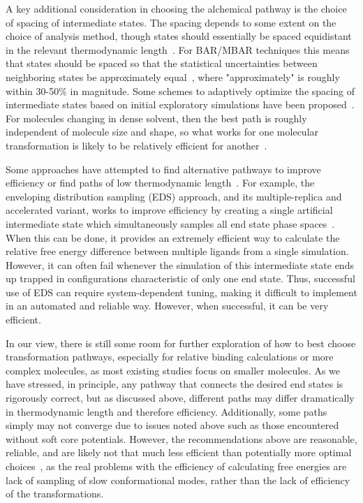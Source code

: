\documentclass[9pt,bestpractices]{livecoms}
\begin{document}
A key additional consideration in choosing the alchemical pathway is the choice of spacing of intermediate states.
The spacing depends to some extent on the choice of analysis method, though states should essentially be spaced equidistant in the relevant thermodynamic length~\cite{crooks2007measuring, sivak2012thermodynamic}.
For BAR/MBAR techniques this means that states should be spaced so that the statistical uncertainties between neighboring states be approximately equal~\cite{pham2012optimal, shenfeld2009minimizing}, where "approximately" is roughly within 30-50\% in magnitude. 
Some schemes to adaptively optimize the spacing of intermediate states based on initial exploratory simulations have been proposed~\cite{hayes2017adaptive}. For molecules changing in dense solvent, then the best path is roughly independent of molecule size and shape, so what works for one molecular transformation is likely to be relatively efficient for another~\cite{monroe2014converging}.


Some approaches have attempted to find alternative pathways to improve efficiency or find paths of low thermodynamic length~\cite{naden2014linear,naden2015linear,pham2012optimal}. For example, the enveloping distribution sampling (EDS) approach, and its multiple-replica and accelerated variant, works to improve efficiency by creating a single artificial intermediate state which simultaneously samples all end state phase spaces~\cite{perthold2018accelerated,sidler2017efficient, christ2007enveloping}. When this can be done, it provides an extremely efficient way to calculate the relative free energy difference between multiple ligands from a single simulation. However, it can often fail whenever the simulation of this intermediate state ends up trapped in configurations characteristic of only one end state. Thus, successful use of EDS can require system-dependent tuning, making it difficult to implement in an automated and reliable way. However, when successful, it can be very efficient.

In our view, there is still some room for further exploration of how to best choose transformation pathways, especially for relative binding calculations or more complex molecules, as most existing studies focus on smaller molecules. As we have stressed, in principle, any pathway that connects the desired end states is rigorously correct, but as discussed above, different paths may differ dramatically in thermodynamic length and therefore efficiency. Additionally, some paths simply may not converge due to issues noted above such as those encountered without soft core potentials. However, the recommendations above are reasonable, reliable, and are likely not that much less efficient than potentially more optimal choices~\cite{naden2014linear,naden2015linear,pham2012optimal}, as the real problems with the efficiency of calculating free energies are lack of sampling of slow conformational modes, rather than the lack of efficiency of the transformations. 
\end{document}
